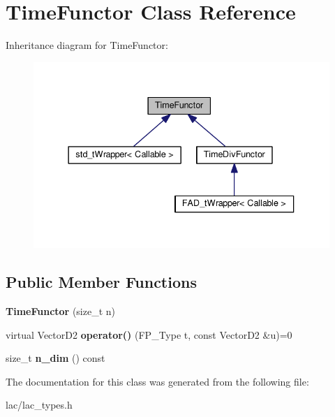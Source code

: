\hypertarget{classTimeFunctor}{}\section{Time\+Functor Class Reference}
\label{classTimeFunctor}


Inheritance diagram for Time\+Functor\+:\nopagebreak
\begin{figure}[H]
\begin{center}
\leavevmode
\includegraphics[width=337pt]{classTimeFunctor__inherit__graph}
\end{center}
\end{figure}
\subsection*{Public Member Functions}
\begin{DoxyCompactItemize}
\item 
\mbox{\label{classTimeFunctor_a22c7b6de02ff9ae0658ea3257026f036}} 
{\bfseries Time\+Functor} (size\+\_\+t n)
\item 
\mbox{\label{classTimeFunctor_a70a13b078de40b96485ee4685d23a63f}} 
virtual Vector\+D2 {\bfseries operator()} (F\+P\+\_\+\+Type t, const Vector\+D2 \&u)=0
\item 
\mbox{\label{classTimeFunctor_a48fd5f83984826085067f21a54e3123e}} 
size\+\_\+t {\bfseries n\+\_\+dim} () const
\end{DoxyCompactItemize}


The documentation for this class was generated from the following file\+:\begin{DoxyCompactItemize}
\item 
lac/lac\+\_\+types.\+h\end{DoxyCompactItemize}
